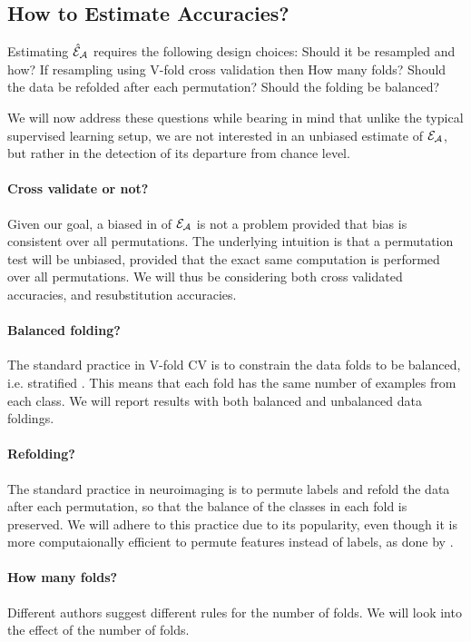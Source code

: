 \documentclass[12pt,a4paper]{article}
\begin{document}
\subsection{How to Estimate Accuracies?}
\label{sec:considerations}

Estimating $\hat{\mathcal{E}}_{\mathcal{A}}$ requires the following design choices: 
Should it be resampled and how? 
If resampling using V-fold cross validation then How many folds? Should the data be refolded after each permutation? Should the folding be balanced? 

We will now address these questions while bearing in mind that unlike the typical supervised learning setup, we are not interested in an unbiased estimate of $\mathcal{E}_{\mathcal{A}}$, but rather in the detection of its departure from chance level. 

\paragraph{Cross validate or not?}
Given our goal, a biased in of $\mathcal{E}_{\mathcal{A}}$ is not a problem provided that bias is consistent over all permutations. 
The underlying intuition is that a permutation test will be unbiased, provided that the exact same computation is performed over all permutations. 
We will thus be considering both cross validated accuracies, and resubstitution accuracies.


\paragraph{Balanced folding?}
The standard practice in V-fold CV is to constrain the data folds to be balanced, i.e. stratified \citep[e.g.][]{ojala_permutation_2010}.
This means that each fold has the same number of examples from each class. 
We will report results with both balanced and unbalanced data foldings. 


\paragraph{Refolding?}
The standard practice in neuroimaging is to permute labels and refold the data after each permutation, so that the balance of the classes in each fold is preserved.
We will adhere to this practice due to its popularity, even though it is more computaionally efficient to permute features instead of labels, as done by \citet{golland_permutation_2005}.


\paragraph{How many folds?}
Different authors suggest different rules for the number of folds. 
We will look into the effect of the number of folds. 
\end{document}

